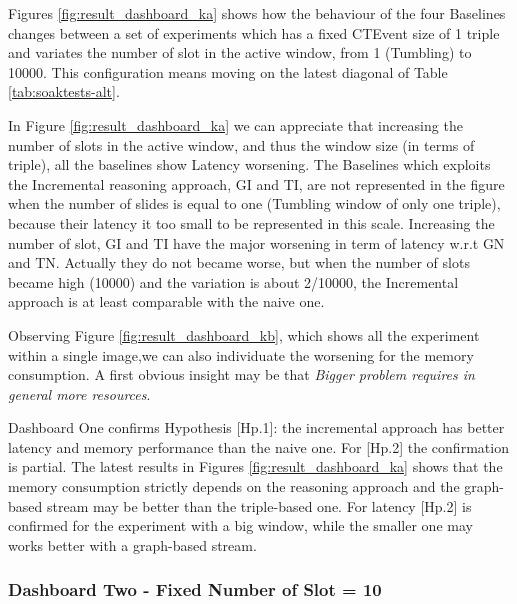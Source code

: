 Figures \ref{fig:result_dashboard_ka} shows how the behaviour of the four Baselines changes between a set of experiments which has a fixed CTEvent size of 1 triple and variates the number of slot in the active window, from 1 (Tumbling) to 10000. This configuration means moving on the latest diagonal of Table \ref{tab:soaktests-alt}.

In Figure \ref{fig:result_dashboard_ka} we can appreciate that increasing the number of slots in the active window, and thus the window size (in terms of triple), all the baselines show Latency worsening. The Baselines which exploits the Incremental reasoning approach, GI and TI, are not represented in the figure when the number of slides is equal to one (Tumbling window of only one triple), because their latency it too small to be represented in this scale. Increasing the number of slot, GI and TI have the major worsening in term of latency w.r.t GN and TN. Actually they do not became worse, but when the number of slots became high (10000) and the variation is about 2/10000, the Incremental approach is at least comparable with the naive one.

Observing Figure \ref{fig:result_dashboard_kb}, which shows all the experiment within a single image,we can also individuate the worsening for the memory consumption. A first obvious insight may be that \textit{Bigger problem requires in general more resources}. %

Dashboard One confirms Hypothesis [Hp.1]: the incremental approach has better latency and memory performance than the naive one. For [Hp.2] the confirmation is partial. The latest results in Figures \ref{fig:result_dashboard_ka} shows that the memory consumption strictly depends on the reasoning approach and the graph-based stream may be better than the triple-based one. For latency [Hp.2] is confirmed for the experiment with a big window, while the smaller one may works better with a graph-based stream.


\subsubsection{Dashboard Two - Fixed Number of Slot = 10}


